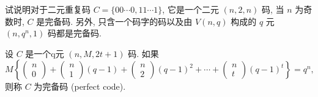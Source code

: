   \begin{tcolorbox}[breakable,colback=blue!5!white,colframe=blue!75!black,
 title= 解答题]

试说明对于二元重复码 $ C=\{00 \cdots 0,11 \cdots 1\} $, 它是一个二元 $ (n, 2, n) $ 码, 当 $ n $ 为奇数时, $ C $ 是完备码. 另外, 只含一个码字的码以及由 $ V(n, q) $ 构成的 $ q $ 元 $ \left(n, q^{n}, 1\right) $ 码都是完备码.

 \tcblower
设 $ C $ 是一个q元 $ (n, M, 2 t+1) $ 码. 如果
$$
M\left\{\left(\begin{array}{l}
n \\
0
\end{array}\right)+\left(\begin{array}{l}
n \\
1
\end{array}\right)(q-1)+\left(\begin{array}{l}
n \\
2
\end{array}\right)(q-1)^{2}+\cdots+\left(\begin{array}{l}
n \\
t
\end{array}\right)(q-1)^{t}\right\}=q^{n},
$$
则称 $ C $ 为完备码 (perfect code).


\end{tcolorbox}
